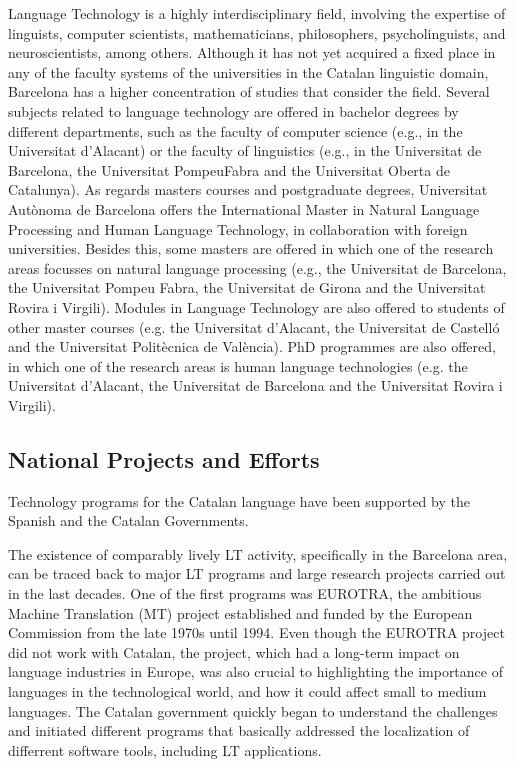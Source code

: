 \begin{multicols}{2}
Language Technology is a highly interdisciplinary field, involving the expertise of linguists, computer scientists, mathematicians, philosophers, psycholinguists, and neuroscientists, among others. Although it has not yet acquired a fixed place in any of the faculty systems of the universities in the Catalan linguistic domain, Barcelona has a higher concentration of studies that consider the field. 
Several subjects related to language technology are offered in bachelor degrees by different departments, such as the faculty of computer science (e.g., in the Universitat d’Alacant) or the faculty of linguistics (e.g., in the Universitat de Barcelona, the Universitat PompeuFabra and the Universitat Oberta de Catalunya).
As regards masters courses and postgraduate degrees, Universitat Autònoma de Barcelona offers the International Master in Natural Language Processing and Human Language Technology, in collaboration with foreign universities. Besides this, some masters are offered in which one of the research areas focusses on natural language processing (e.g., the Universitat de Barcelona, the Universitat Pompeu Fabra, the Universitat de Girona and the Universitat Rovira i Virgili). Modules in Language Technology are also offered to students of other master courses (e.g. the Universitat d’Alacant, the Universitat de Castelló and the Universitat Politècnica de València). 
PhD programmes are also offered, in which one of the research areas is human language technologies (e.g. the Universitat d’Alacant, the Universitat de Barcelona and the Universitat Rovira i Virgili).

\subsection{National Projects and Efforts}

Technology programs for the Catalan language have been supported by the Spanish and the Catalan Governments.

The existence of comparably lively LT activity, specifically in the Barcelona area, can be traced back to major LT programs and large research projects carried out in the last decades. One of the first programs was EUROTRA, the ambitious Machine Translation (MT) project established and funded by the European Commission from the late 1970s until 1994. Even though the EUROTRA project did not work with Catalan, the project, which had a long-term impact on language industries in Europe, was also crucial to highlighting the importance of languages in the technological world, and how it could affect small to medium languages. The Catalan government quickly began to understand the challenges and initiated different programs that basically addressed the localization of differrent software tools, including LT applications. 


\end{multicols}

